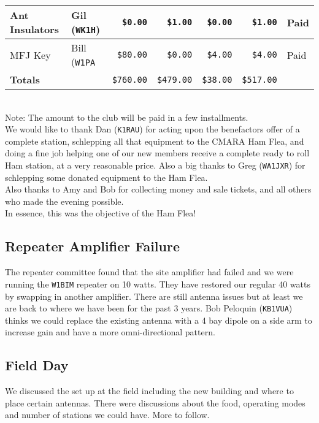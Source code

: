 \documentclass[10pt,letterpaper]{article}
\begin{document}
\begin{tabular}{|l|l|r|r|r|r|l|}
Ant Insulators     & Gil (\texttt{WK1H})    & \texttt{\$0.00}   & \texttt{\$1.00}   & \texttt{\$0.00}   & \texttt{\$1.00}     & Paid          \\ \hline
MFJ Key            & Bill (\texttt{W1PA}    & \texttt{\$80.00}  & \texttt{\$0.00}   & \texttt{\$4.00}   & \texttt{\$4.00}     & Paid          \\ \hline \hline
\textbf{Totals}    &                        & \texttt{\$760.00} & \texttt{\$479.00} & \texttt{\$38.00}  & \texttt{\$517.00}   &               \\ \hline
\end{tabular}\\
\noindent
\textasteriskcentered{}Note: The amount to the club will be paid in a few installments.\\

\noindent
We would like to thank Dan (\texttt{K1RAU}) for acting upon the benefactors offer of a complete station, schlepping all that equipment to the CMARA Ham Flea, and doing a fine job helping one of our new members receive a complete ready to roll Ham station, at a very reasonable price. Also a big thanks to Greg (\texttt{WA1JXR}) for schlepping some donated equipment to the Ham Flea.\\

\noindent
Also thanks to Amy and Bob for collecting money and sale tickets, and all others who made the evening possible. \\

\noindent
In essence, this was the objective of the Ham Flea!

\subsection{Repeater Amplifier Failure}
The repeater committee found that the site amplifier had failed and we were running the \texttt{W1BIM} repeater on 10 watts. They have restored our regular 40 watts by swapping in another amplifier. There are still antenna issues but at least we are back to where we have been for the past 3 years. Bob Peloquin (\texttt{KB1VUA}) thinks we could replace the existing antenna with a 4 bay dipole on a side arm to increase gain and have a more omni-directional pattern.

\subsection{Field Day}
We discussed the set up at the field including the new building and where to place certain antennas. There were discussions about the food, operating modes and number of stations we could have. More to follow.
\end{document}
